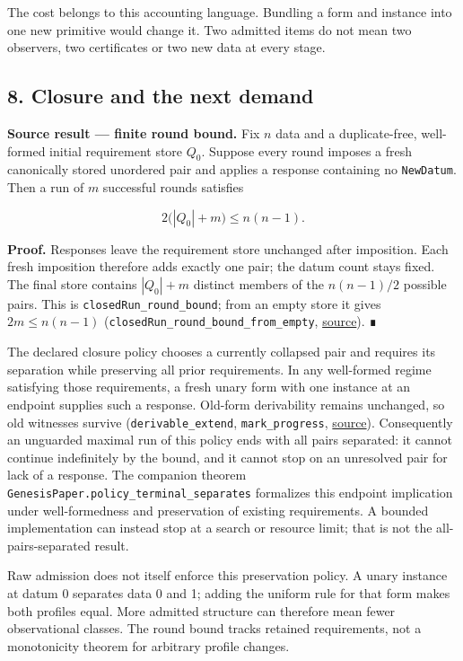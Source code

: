 \documentclass[
  11pt,
]{article}
\begin{document}
The cost belongs to this accounting language. Bundling a form and
instance into one new primitive would change it. Two admitted items do
not mean two observers, two certificates or two new data at every stage.

\subsection{8. Closure and the next
demand}\label{closure-and-the-next-demand}

\textbf{Source result --- finite round bound.} Fix \(n\) data and a
duplicate-free, well-formed initial requirement store \(Q_0\). Suppose
every round imposes a fresh canonically stored unordered pair and
applies a response containing no \nolinkurl{NewDatum}. Then a run of \(m\)
successful rounds satisfies

\[
2\bigl(|Q_0|+m\bigr)\le n(n-1).
\]

\textbf{Proof.} Responses leave the requirement store unchanged after
imposition. Each fresh imposition therefore adds exactly one pair; the
datum count stays fixed. The final store contains \(|Q_0|+m\) distinct
members of the \(n(n-1)/2\) possible pairs. This is
\nolinkurl{closedRun_round_bound}; from an empty store it gives
\(2m\le n(n-1)\) (\nolinkurl{closedRun_round_bound_from_empty},
\href{lean4/Derivation/Rounds.lean\#L452}{source}). ∎

The declared closure policy chooses a currently collapsed pair and
requires its separation while preserving all prior requirements. In any
well-formed regime satisfying those requirements, a fresh unary form
with one instance at an endpoint supplies such a response. Old-form
derivability remains unchanged, so old witnesses survive
(\nolinkurl{derivable_extend}, \nolinkurl{mark_progress},
\href{lean4/Derivation/Progress.lean\#L43}{source}). Consequently an
unguarded maximal run of this policy ends with all pairs separated: it
cannot continue indefinitely by the bound, and it cannot stop on an
unresolved pair for lack of a response. The companion theorem
\nolinkurl{GenesisPaper.policy_terminal_separates} formalizes this
endpoint implication under well-formedness and preservation of existing
requirements. A bounded implementation can instead stop at a search or
resource limit; that is not the all-pairs-separated result.

Raw admission does not itself enforce this preservation policy. A unary
instance at datum 0 separates data 0 and 1; adding the uniform rule for
that form makes both profiles equal. More admitted structure can
therefore mean fewer observational classes. The round bound tracks
retained requirements, not a monotonicity theorem for arbitrary profile
changes.
\end{document}
